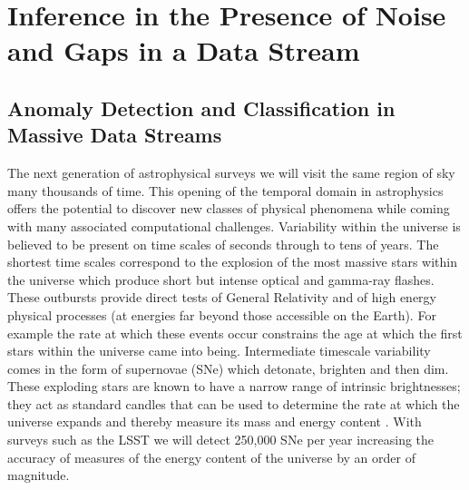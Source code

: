 \documentclass[useAMS,usenatbib,tightenlines,11pt,preprint]{aastex}
\begin{document}
\section{Inference in the Presence of Noise and Gaps in a Data
  Stream}




\subsection{Anomaly Detection and Classification in Massive Data
 Streams}

The next generation of astrophysical surveys we will visit the same
region of sky many thousands of time. This opening of the temporal
domain in astrophysics offers the potential to discover new classes of
physical phenomena while coming with many associated computational
challenges. Variability within the universe is believed to be present
on time scales of seconds through to tens of years. The shortest time
scales correspond to the explosion of the most massive stars within
the universe which produce short but intense optical and gamma-ray
flashes. These outbursts provide direct tests of General Relativity
and of high energy physical processes (at energies far beyond those
accessible on the Earth). For example the rate at which these events
occur constrains the age at which the first stars within the universe
came into being. Intermediate timescale variability comes in the form
of supernovae (SNe) which detonate, brighten and then dim. These
exploding stars are known to have a narrow range of intrinsic
brightnesses; they act as standard candles that can be used to
determine the rate at which the universe expands and thereby measure
its mass and energy content \cite{perlmutter99}. 
With surveys such as the LSST we will detect 250,000 SNe per year
increasing the accuracy of measures of the energy content of the
universe by an order of magnitude.
\end{document}
